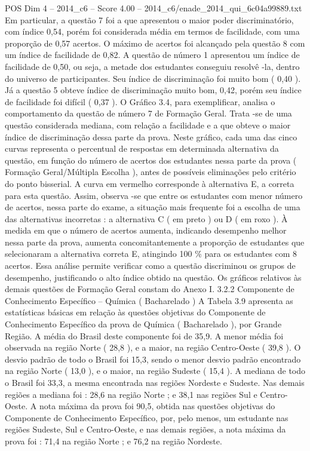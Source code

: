 \begin{textsample}{POS Dim 4 – 2014\_c6 – Score 4.00 – 2014\_c6/enade\_2014\_qui\_6c04a99889.txt}
Em particular, a questão 7 foi a que apresentou o maior poder discriminatório, com índice 0,54, porém foi considerada média em termos de facilidade, com uma proporção de 0,57 acertos.
O máximo de acertos foi alcançado pela questão 8 com um índice de facilidade de 0,82.
A questão de número 1 apresentou um índice de facilidade de 0,50, ou seja, a metade dos estudantes conseguiu resolvê -la, dentro do universo de participantes.
Seu índice de discriminação foi muito bom ( 0,40 ).
Já a questão 5 obteve índice de discriminação muito bom, 0,42, porém seu índice de facilidade foi difícil ( 0,37 ).
O Gráfico 3.4, para exemplificar, analisa o comportamento da questão de número 7 de Formação Geral.
Trata -se de uma questão considerada mediana, com relação a facilidade e a que obteve o maior índice de discriminação dessa parte da prova.
Neste gráfico, cada uma das cinco curvas representa o percentual de respostas em determinada alternativa da questão, em função do número de acertos dos estudantes nessa parte da prova ( Formação Geral/Múltipla Escolha ), antes de possíveis eliminações pelo critério do ponto bisserial.
A curva em vermelho corresponde à alternativa E, a correta para esta questão.
Assim, observa -se que entre os estudantes com menor número de acertos, nessa parte do exame, a situação mais frequente foi a escolha de uma das alternativas incorretas : a alternativa C ( em preto ) ou D ( em roxo ).
À medida em que o número de acertos aumenta, indicando desempenho melhor nessa parte da prova, aumenta concomitantemente a proporção de estudantes que selecionaram a alternativa correta E, atingindo 100 \% para os estudantes com 8 acertos.
Essa análise permite verificar como a questão discriminou os grupos de desempenho, justificando o alto índice obtido na questão.
Os gráficos relativos às demais questões de Formação Geral constam do Anexo I. 3.2.2 Componente de Conhecimento Específico – Química ( Bacharelado ) A Tabela 3.9 apresenta as estatísticas básicas em relação às questões objetivas do Componente de Conhecimento Específico da prova de Química ( Bacharelado ), por Grande Região.
A média do Brasil deste componente foi de 35,9.
A menor média foi observada na região Norte ( 28,8 ), e a maior, na região Centro-Oeste ( 39,8 ).
O desvio padrão de todo o Brasil foi 15,3, sendo o menor desvio padrão encontrado na região Norte ( 13,0 ), e o maior, na região Sudeste ( 15,4 ).
A mediana de todo o Brasil foi 33,3, a mesma encontrada nas regiões Nordeste e Sudeste.
Nas demais regiões a mediana foi : 28,6 na região Norte ; e 38,1 nas regiões Sul e Centro-Oeste.
A nota máxima da prova foi 90,5, obtida nas questões objetivas do Componente de Conhecimento Específico, por, pelo menos, um estudante nas regiões Sudeste, Sul e Centro-Oeste, e nas demais regiões, a nota máxima da prova foi : 71,4 na região Norte ; e 76,2 na região Nordeste.

\end{textsample}
